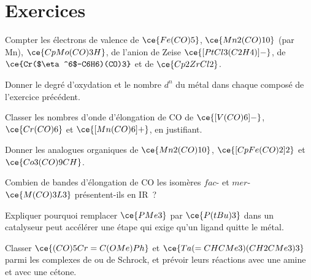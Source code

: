 \section{Exercices}

\begin{exercise}[$\star$]\label{exo:b3:organometallic-bonding:1}
Compter les électrons de valence de $\ce{Fe(CO)5}$, $\ce{Mn2(CO)10}$ (par Mn), $\ce{CpMo(CO)3H}$, de l'anion de Zeise
$\ce{[PtCl3(C2H4)]-}$, de $\ce{Cr($\eta^6$-C6H6)(CO)3}$ et de $\ce{Cp2ZrCl2}$.
\end{exercise}

\begin{exercise}[$\star$]\label{exo:b3:organometallic-bonding:2}
Donner le degré d'oxydation et le nombre $d^n$ du métal dans chaque composé
de l'exercice précédent.
\end{exercise}

\begin{exercise}[$\star$]\label{exo:b3:organometallic-bonding:3}
Classer les nombres d'onde d'élongation de CO de $\ce{[V(CO)6]-}$, $\ce{Cr(CO)6}$ et $\ce{[Mn(CO)6]+}$, en justifiant.
\end{exercise}

\begin{exercise}[$\star$]\label{exo:b3:organometallic-bonding:4}
Donner les analogues organiques  de $\ce{Mn2(CO)10}$, $\ce{[CpFe(CO)2]2}$ et $\ce{Co3(CO)9CH}$.
\end{exercise}

\begin{exercise}[$\star\star$]\label{exo:b3:organometallic-bonding:5}
Combien de bandes d'élongation de CO les isomères $fac$- et $mer$-$\ce{M(CO)3L3}$ présentent-ils en IR~?
\end{exercise}

\begin{exercise}[$\star\star$]\label{exo:b3:organometallic-bonding:6}
Expliquer pourquoi remplacer $\ce{PMe3}$ par $\ce{P(tBu)3}$ dans un catalyseur peut accélérer une étape qui exige
qu'un ligand quitte le métal.
\end{exercise}

\begin{exercise}[$\star\star$]\label{exo:b3:organometallic-bonding:7}
Classer $\ce{(CO)5Cr=C(OMe)Ph}$ et $\ce{Ta(=CHCMe3)(CH2CMe3)3}$ parmi les complexes de  ou de Schrock, et prévoir leurs réactions avec une amine et avec une
cétone.
\end{exercise}

